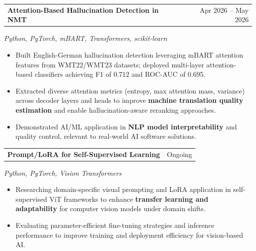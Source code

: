 \documentclass[letterpaper,10pt]{article}
\makeatletter
\newcommand{\entry}[2]{%
  \noindent  
  \begin{tabularx}{\linewidth}  
    {@{}>{\raggedright\arraybackslash}X@{\hspace{6pt}}r@{}}  
    \textbf{#1} & #2  
  \end{tabularx}\par  
}
\newcommand{\bullets}{  
  \begin{itemize}[  
    leftmargin=1.2em,  
    topsep=2pt,  
    itemsep=1pt,  
    parsep=0pt,  
    partopsep=0pt  
  ]  
}
\newcommand{\finishbullets}{  
  \end{itemize}  
}
\makeatother
\begin{document}
\entry  
  {Attention-Based Hallucination Detection in NMT}  
  {Apr 2026 -- May 2026}  

\textit{Python, PyTorch, mBART, Transformers, scikit-learn}  

\bullets  

  \item Built English-German hallucination detection leveraging mBART attention features from WMT22/WMT23 datasets; deployed multi-layer attention-based classifiers achieving F1 of 0.712 and ROC-AUC of 0.695.  

  \item Extracted diverse attention metrics (entropy, max attention mass, variance) across decoder layers and heads to improve \textbf{machine translation quality estimation} and enable hallucination-aware reranking approaches.  

  \item Demonstrated AI/ML application in \textbf{NLP model interpretability} and quality control, relevant to real-world AI software solutions.  

\finishbullets  

\entry  
  {Prompt/LoRA for Self-Supervised Learning}  
  {Ongoing}  

\textit{Python, PyTorch, Vision Transformers}  

\bullets  

  \item Researching domain-specific visual prompting and LoRA application in self-supervised ViT frameworks to enhance \textbf{transfer learning and adaptability} for computer vision models under domain shifts.  

  \item Evaluating parameter-efficient fine-tuning strategies and inference performance to improve training and deployment efficiency for vision-based AI.  

\finishbullets  
\end{document}

